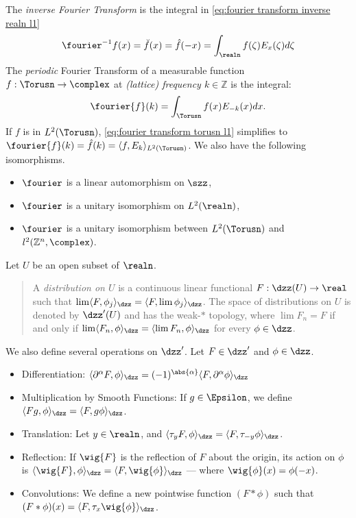 \documentclass[../main-v2-manifolds.tex]{subfiles}
\begin{document}
The \emph{inverse Fourier Transform} is the integral in \cref{eq:fourier transform inverse realn l1}
\begin{equation}
    \fourier^{-1}{f}(x) = \breve{f}(x) = \hat{f}(-x) = \int_{\realn}f(\zeta)E_{x}(\zeta)d\zeta
    \label{eq:fourier transform inverse realn l1}
\end{equation}
The \emph{periodic} Fourier Transform of a measurable function $f: \Torusn\to \complex$ at \emph{(lattice) frequency $k\in\mathbb{Z}$} is the integral:
\begin{equation}
    \fourier{f}(k) = \int_{\Torusn} f(x)E_{-k}(x)dx.
    \label{eq:fourier transform torusn l1}
\end{equation}
If $f$ is in $L^2(\Torusn)$, \cref{eq:fourier transform torusn l1} simplifies to $\fourier{f}(k) = \hat{f}(k)=\langle f, E_{k}\rangle_{L^2(\Torusn)}$. We also have the following isomorphisms.
\begin{itemize}
    \item $\fourier$ is a linear automorphism on $\szz$,
    \item $\fourier$ is a unitary isomorphism on $L^2(\realn)$,
    \item $\fourier$ is a unitary isomorphism between $L^2(\Torusn)$ and $l^2(\mathbb{Z}^n,\complex)$.
\end{itemize}
Let $U$ be an open subset of $\realn$. 
\begin{quote}
    A \emph{distribution on $U$} is a continuous linear functional $F:\dzz(U)\to\real$ such that $\lim \langle F,\phi_j\rangle_{\dzz} = \langle F,\lim \phi_j\rangle_{\dzz}$. The space of distributions on $U$ is denoted by $\dzz'(U)$ and has the weak-$\ast$ topology, where $\lim F_n=F$ if and only if $\lim\langle F_n,\phi\rangle_{\dzz}=\langle \lim F_n,\phi\rangle_{\dzz}$ for every $\phi\in\dzz$.
\end{quote}
We also define several operations on $\dzz'$. Let $F\in\dzz'$ and $\phi\in\dzz$.
\begin{itemize}
    \item Differentiation: $\langle \partial^\alpha F,\phi\rangle_{\dzz} = (-1)^{\abs{\alpha}}\langle F,\partial^\alpha\phi\rangle_{\dzz}$
    \item Multiplication by Smooth Functions: If $g\in \Epsilon$, we define $\langle Fg,\phi\rangle_{\dzz} = \langle F,g\phi\rangle_{\dzz}$.
    \item Translation: Let $y\in\realn$, and $\langle \tau_y 
    F,\phi\rangle_{\dzz} = \langle F,\tau_{-y}\phi\rangle_{\dzz}$.
    \item Reflection: If $\wig{F}$ is the reflection of $F$ about the origin, its action on $\phi$ is $\langle \wig{F},\phi\rangle_{\dzz} = \langle F,\wig{\phi}\rangle_{\dzz}$ --- where $\wig{\phi}(x) = \phi(-x)$.
    \item Convolutions: We define a new pointwise function $(F\ast \phi)$ such that $(F\ast\phi)(x) = \langle F,\tau_x\wig{\phi}\rangle_{\dzz}$. 
\end{itemize}
\end{document}
